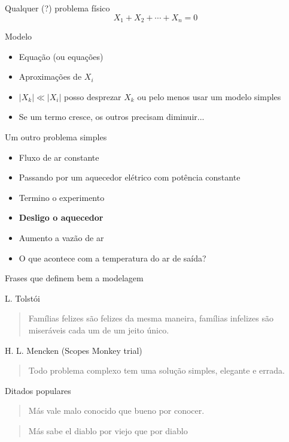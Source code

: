\documentclass{beamer}
\begin{document}
\begin{frame}{Qualquer (?) problema físico}
  \[X_1 + X_2 + \cdots + X_n = 0\]

  Modelo
  \begin{itemize}
    \item Equação (ou equações)
    \item Aproximações de $X_i$
    \item $|X_k| \ll |X_i|$ posso desprezar $X_k$ ou pelo menos usar um modelo simples
    \item Se um termo cresce, os outros precisam diminuir...
  \end{itemize}

\end{frame}


\begin{frame}{Um outro problema simples}

  \begin{itemize}
   \item Fluxo de ar constante 
   \item Passando por um aquecedor elétrico com potência constante
   \item Termino o experimento
   \item \textbf{Desligo o aquecedor}
   \item Aumento a vazão de ar
   \item O que acontece com a temperatura do ar de saída?
  \end{itemize}
\end{frame}

\begin{frame}{Frases que definem bem a modelagem}

 L. Tolstói  \begin{quote}
    Famílias felizes são felizes da mesma maneira, famílias infelizes são miseráveis cada um de um jeito único.
  \end{quote}

 H. L. Mencken (Scopes Monkey trial)
 \begin{quote}
Todo problema complexo tem uma solução simples, elegante e errada.
  \end{quote}
  
Ditados populares
  \begin{quote}
    Más vale malo conocido que bueno por conocer.
  \end{quote}

  \begin{quote}
    Más sabe el diablo por viejo que por diablo
  \end{quote}
  
\end{frame}
\end{document}
